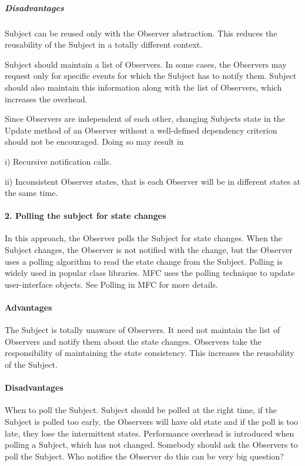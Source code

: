\documentclass{book}
\begin{document}
\subparagraph{Disadvantages}

    Subject can be reused only with the Observer abstraction. This reduces the reusability of the Subject in a totally different context.

    Subject should maintain a list of Observers. In some cases, the Observers may request only for specific events for which the Subject has to notify them.
    Subject should also maintain this information along with the list of Observers, which increases the overhead.

    Since Observers are independent of each other, changing Subjects state in the Update method of an Observer without a well-defined dependency criterion should not be encouraged.
    Doing so may result in 

i) Recursive notification calls.

ii) Inconsistent Observer states, that is each Observer will be in different states at the same time.

\paragraph{2. Polling the subject for state changes}

In this approach, the Observer polls the Subject for state changes.
When the Subject changes, the Observer is not notified with the change, but the Observer uses a polling algorithm to read the state change from the Subject.
Polling is widely used in popular class libraries. MFC uses the polling technique to update user-interface objects. See Polling in MFC for more details.

\paragraph{Advantages}

    The Subject is totally unaware of Observers. It need not maintain the list of Observers and notify them about the state changes.
    Observers take the responsibility of maintaining the state consistency. This increases the reusability of the Subject.

\paragraph{Disadvantages}


    When to poll the Subject. Subject should be polled at the right time, if the Subject is polled too early,
    the Observers will have old state and if the poll is too late, they lose the intermittent states.
    Performance overhead is introduced when polling a Subject, which has not changed.
    Somebody should ask the Observers to poll the Subject. Who notifies the Observer do this can be very big question?
\end{document}
